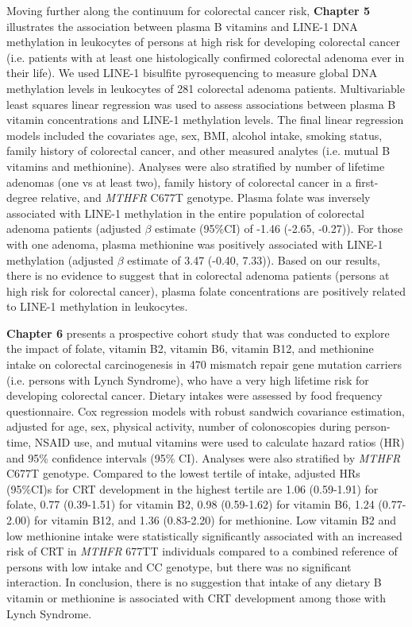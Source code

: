 \noindent Moving further along the continuum for colorectal cancer risk, \textbf{Chapter 5} illustrates the association between plasma B vitamins and LINE-1 DNA methylation in leukocytes of persons at high risk for developing colorectal cancer (i.e. patients with at least one histologically confirmed colorectal adenoma ever in their life). We used LINE-1 bisulfite pyrosequencing to measure global DNA methylation levels in leukocytes of 281 colorectal adenoma patients. Multivariable least squares linear regression was used to assess associations between plasma B vitamin concentrations and LINE-1 methylation levels. The final linear regression models included the covariates age, sex, BMI, alcohol intake, smoking status, family history of colorectal cancer, and other measured analytes (i.e. mutual B vitamins and methionine). Analyses were also stratified by number of lifetime adenomas (one vs at least two), family history of colorectal cancer in a first-degree relative, and \emph{MTHFR} C677T genotype. Plasma folate was inversely associated with LINE-1 methylation in the entire population of colorectal adenoma patients (adjusted $\beta$ estimate (95\%CI) of -1.46 (-2.65, -0.27)). For those with one adenoma, plasma methionine was positively associated with LINE-1 methylation (adjusted $\beta$ estimate of 3.47 (-0.40, 7.33)). Based on our results, there is no evidence to suggest that in colorectal adenoma patients (persons at high risk for colorectal cancer), plasma folate concentrations are positively related to LINE-1 methylation in leukocytes.

\noindent \textbf{Chapter 6} presents a prospective cohort study that was conducted to explore the impact of folate, vitamin B2, vitamin B6, vitamin B12, and methionine intake on colorectal carcinogenesis in 470 mismatch repair gene mutation carriers (i.e. persons with Lynch Syndrome), who have a very high lifetime risk for developing colorectal cancer. Dietary intakes were assessed by food frequency questionnaire. Cox regression models with robust sandwich covariance estimation, adjusted for age, sex, physical activity, number of colonoscopies during person-time, NSAID use, and mutual vitamins were used to calculate hazard ratios (HR) and 95\% confidence intervals (95\% CI). Analyses were also stratified by \emph{MTHFR} C677T genotype. Compared to the lowest tertile of intake, adjusted HRs (95\%CI)s for CRT development in the highest tertile are 1.06 (0.59-1.91) for folate, 0.77 (0.39-1.51) for vitamin B2, 0.98 (0.59-1.62) for vitamin B6, 1.24 (0.77-2.00) for vitamin B12, and 1.36 (0.83-2.20) for methionine. Low vitamin B2 and low methionine intake were statistically significantly associated with an increased risk of CRT in \emph{MTHFR} 677TT individuals compared to a combined reference of persons with low intake and CC genotype, but there was no significant interaction. In conclusion, there is no suggestion that intake of any dietary B vitamin or methionine is associated with CRT development among those with Lynch Syndrome.

